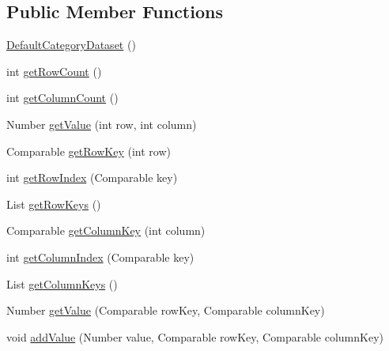 \subsection*{Public Member Functions}
\begin{DoxyCompactItemize}
\item 
\mbox{\hyperlink{classorg_1_1jfree_1_1data_1_1category_1_1_default_category_dataset_a7aef01d862220fc6f4f384c31f2477fe}{Default\+Category\+Dataset}} ()
\item 
int \mbox{\hyperlink{classorg_1_1jfree_1_1data_1_1category_1_1_default_category_dataset_ae3c00007b8dd22c911f2cb6463508785}{get\+Row\+Count}} ()
\item 
int \mbox{\hyperlink{classorg_1_1jfree_1_1data_1_1category_1_1_default_category_dataset_a355c4edd8c94a622747aed4fcb9388a4}{get\+Column\+Count}} ()
\item 
Number \mbox{\hyperlink{classorg_1_1jfree_1_1data_1_1category_1_1_default_category_dataset_a981ce76eb60f9627756108f7f7a49933}{get\+Value}} (int row, int column)
\item 
Comparable \mbox{\hyperlink{classorg_1_1jfree_1_1data_1_1category_1_1_default_category_dataset_a8828cdefd54d499565516fa42d44f89a}{get\+Row\+Key}} (int row)
\item 
int \mbox{\hyperlink{classorg_1_1jfree_1_1data_1_1category_1_1_default_category_dataset_a2ba50eec333627d8a187c2f252b8600a}{get\+Row\+Index}} (Comparable key)
\item 
List \mbox{\hyperlink{classorg_1_1jfree_1_1data_1_1category_1_1_default_category_dataset_abc377b9d7b99192614e8a35984d7d5d3}{get\+Row\+Keys}} ()
\item 
Comparable \mbox{\hyperlink{classorg_1_1jfree_1_1data_1_1category_1_1_default_category_dataset_a830798ee850da00ea96dcf29f28c70e7}{get\+Column\+Key}} (int column)
\item 
int \mbox{\hyperlink{classorg_1_1jfree_1_1data_1_1category_1_1_default_category_dataset_abd03d702aa033c675c043d04578fdd16}{get\+Column\+Index}} (Comparable key)
\item 
List \mbox{\hyperlink{classorg_1_1jfree_1_1data_1_1category_1_1_default_category_dataset_aca704a2ac8b38d61e38b2c0e843024f0}{get\+Column\+Keys}} ()
\item 
Number \mbox{\hyperlink{classorg_1_1jfree_1_1data_1_1category_1_1_default_category_dataset_a5e7aadea1d0257eaccec5836b66a0d3e}{get\+Value}} (Comparable row\+Key, Comparable column\+Key)
\item 
void \mbox{\hyperlink{classorg_1_1jfree_1_1data_1_1category_1_1_default_category_dataset_a69d2a96abc039f088e63b39fcaa4cbe1}{add\+Value}} (Number value, Comparable row\+Key, Comparable column\+Key)

\end{DoxyCompactItemize}
